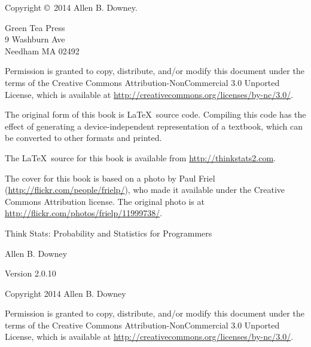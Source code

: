 \documentclass[12pt]{book}
\newcommand{\thetitle}{Think Stats: Probability and Statistics for Programmers}
\newcommand{\theversion}{2.0.10}
\begin{document}
\begin{latexonly}
\begin{flushright}
\vfill

\end{flushright}


\pagebreak
\thispagestyle{empty}

{\small
Copyright \copyright ~2014 Allen B. Downey.


\vspace{0.2in}

\begin{flushleft}
Green Tea Press       \\
9 Washburn Ave \\
Needham MA 02492
\end{flushleft}

Permission is granted to copy, distribute, and/or modify this document
under the terms of the Creative Commons Attribution-NonCommercial 3.0 Unported
License, which is available at \url{http://creativecommons.org/licenses/by-nc/3.0/}.

The original form of this book is \LaTeX\ source code.  Compiling this
code has the effect of generating a device-independent representation
of a textbook, which can be converted to other formats and printed.

The \LaTeX\ source for this book is available from
\url{http://thinkstats2.com}.

The cover for this book is based on a photo by Paul Friel
(\url{http://flickr.com/people/frielp/}), who made it available under
the Creative Commons Attribution license.  The original photo
is at \url{http://flickr.com/photos/frielp/11999738/}.

\vspace{0.2in}

} %

\end{latexonly}



\begin{htmlonly}


{\Large \thetitle}

{\large Allen B. Downey}

Version \theversion

\vspace{0.25in}

Copyright 2014 Allen B. Downey

\vspace{0.25in}

Permission is granted to copy, distribute, and/or modify this document
under the terms of the Creative Commons Attribution-NonCommercial 3.0
Unported License, which is available at
\url{http://creativecommons.org/licenses/by-nc/3.0/}.

\setcounter{chapter}{-1}

\end{htmlonly}
\end{document}
